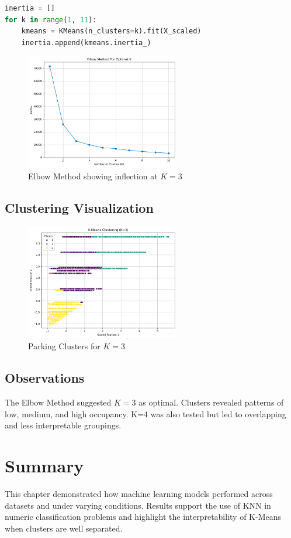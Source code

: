\begin{lstlisting}[language=Python, caption={Elbow Method for Optimal K}, label=list:elbow]
inertia = []
for k in range(1, 11):
    kmeans = KMeans(n_clusters=k).fit(X_scaled)
    inertia.append(kmeans.inertia_)
\end{lstlisting}

\begin{figure}[H]
    \centering
    \includegraphics[width=0.6\textwidth]{figures/parking_elbow_plot.png}
    \caption{Elbow Method showing inflection at $K=3$}
    \label{fig:parking_elbow}
\end{figure}

\subsection{Clustering Visualization}

\begin{figure}[H]
    \centering
    \includegraphics[width=0.6\textwidth]{figures/parking_clusters_k3.png}
    \caption{Parking Clusters for $K=3$}
    \label{fig:parking_clusters_k3}
\end{figure}

\subsection{Observations}

The Elbow Method suggested $K=3$ as optimal. Clusters revealed patterns of low, medium, and high occupancy. K=4 was also tested but led to overlapping and less interpretable groupings.

\section{Summary}

This chapter demonstrated how machine learning models performed across datasets and under varying conditions. Results support the use of KNN in numeric classification problems and highlight the interpretability of K-Means when clusters are well separated.